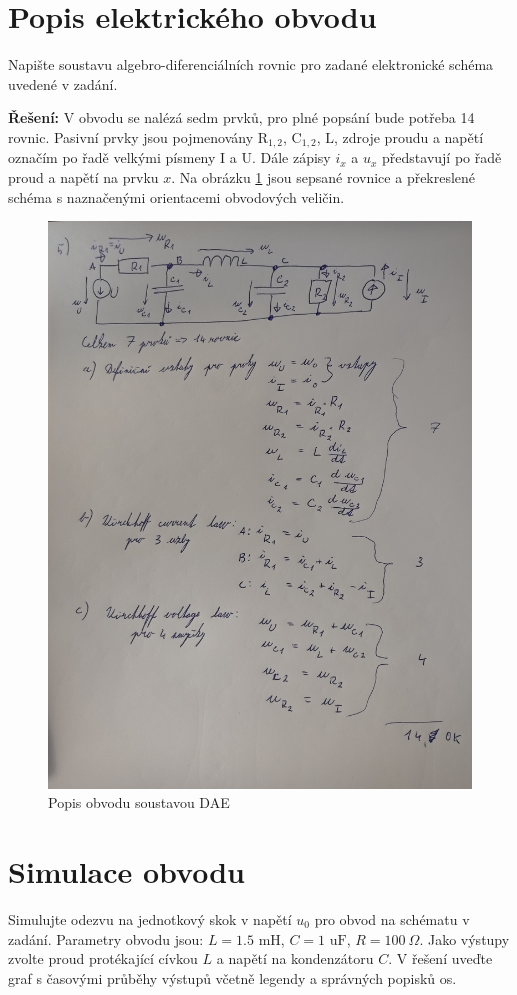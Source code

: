 \documentclass[twoside]{article}
\begin{document}
\newpage
\section{Popis elektrického obvodu}
Napište soustavu algebro-diferenciálních rovnic pro zadané elektronické schéma uvedené v zadání.

\textbf{Řešení:}
V obvodu se nalézá sedm prvků, pro plné popsání bude potřeba 14 rovnic. Pasivní prvky jsou pojmenovány
$\text{R}_{1,2}$, $\text{C}_{1,2}$, $\text{L}$, zdroje proudu a napětí označím po řadě velkými písmeny I a U. 
Dále zápisy $i_x$ a $u_x$ představují po řadě proud a napětí na prvku $x$. Na obrázku \ref{fig:soustava_rovnic} jsou sepsané rovnice
a překreslené schéma s naznačenými orientacemi obvodových veličin. 

\begin{figure}[htb]
	\centering
	\includegraphics[width=.70\linewidth]{obvod_soustava_rovnic.jpg}
	\caption{Popis obvodu soustavou DAE}
	\label{fig:soustava_rovnic}
\end{figure}

\section{Simulace obvodu}
Simulujte odezvu na jednotkový skok v napětí $u_0$ pro obvod na schématu v zadání.
Parametry obvodu jsou: $L = 1.5 \text{ mH}$, $C =1 \text{ uF}$, $R = 100~\Omega$.
Jako výstupy zvolte proud protékající cívkou $L$ a napětí na kondenzátoru $C$.
V řešení uveďte graf s časovými průběhy výstupů včetně legendy a správných popisků os.
\end{document}
